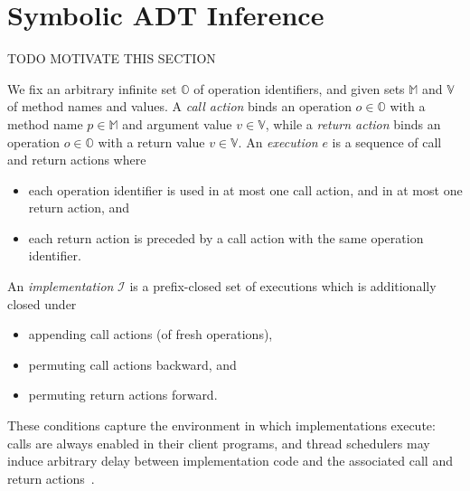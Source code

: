 \section{Symbolic ADT Inference}
\label{sec:inference}

TODO MOTIVATE THIS SECTION

We fix an arbitrary infinite set $\mathbb{O}$ of operation identifiers, and
given sets $\mathbb{M}$ and $\mathbb{V}$ of method names and values. A
\emph{call action} binds an operation $o \in \mathbb{O}$ with a method name $p
\in \mathbb{M}$ and argument value $v \in \mathbb{V}$, while a \emph{return
action} binds an operation $o \in \mathbb{O}$ with a return value $v \in
\mathbb{V}$. An \emph{execution} $e$ is a sequence of call and return actions
where
\begin{itemize}

  \item each operation identifier is used in at most one call action, and in at
  most one return action, and

  \item each return action is preceded by a call action with the same operation
  identifier.

\end{itemize}
An \emph{implementation} $\mathcal{I}$ is a prefix-closed set of executions
which is additionally closed under
\begin{itemize}

  \item appending call actions (of fresh operations),

  \item permuting call actions backward, and

  \item permuting return actions forward.

\end{itemize}
These conditions capture the environment in which implementations execute:
calls are always enabled in their client programs, and thread schedulers may
induce arbitrary delay between implementation code and the associated call and
return actions~\cite{conf/popl/BouajjaniEEH15}.

